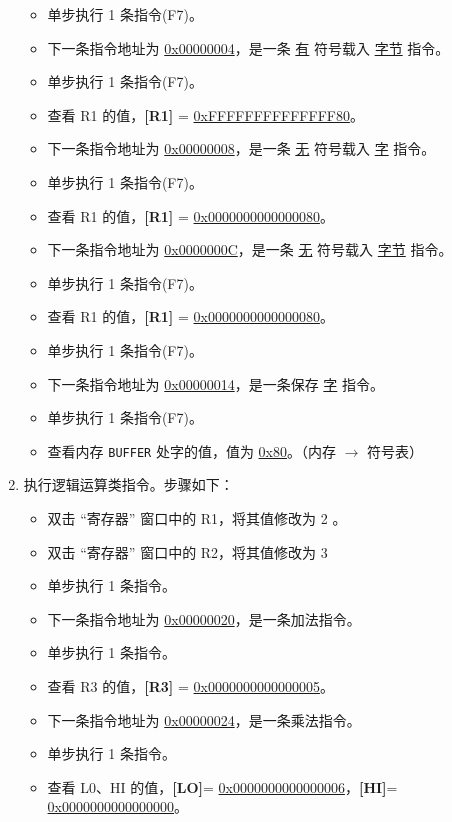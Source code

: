 \documentclass[blue,normal,cn]{elegantnote}
\newcommand{\code}[1]{\colorbox{light-gray}{\texttt{#1}}}
\begin{document}
\begin{enumerate}[wide=0pt, listparindent=2em, parsep=0pt]
          \begin{itemize}[leftmargin=3em]
              \item 单步执行 1 条指令(F7)。
              \item 下一条指令地址为 \uline{0x00000004}，是一条 \uline{有} 符号载入 \uline{字节} 指令。
              \item 单步执行 1 条指令(F7)。
              \item 查看 R1 的值，\textbf{[R1]} = \uline{0xFFFFFFFFFFFFFF80}。
              \item 下一条指令地址为 \uline{0x00000008}，是一条 \uline{无} 符号载入 \uline{字} 指令。
              \item 单步执行 1 条指令(F7)。
              \item 查看 R1 的值，\textbf{[R1]} = \uline{0x0000000000000080}。
              \item 下一条指令地址为 \uline{0x0000000C}，是一条 \uline{无} 符号载入 \uline{字节} 指令。
              \item 单步执行 1 条指令(F7)。
              \item 查看 R1 的值，\textbf{[R1]} = \uline{0x0000000000000080}。
              \item 单步执行 1 条指令(F7)。
              \item 下一条指令地址为 \uline{0x00000014}，是一条保存 \uline{字} 指令。
              \item 单步执行 1 条指令(F7)。
              \item 查看内存 \code{BUFFER} 处字的值，值为 \uline{0x80}。（内存 $\rightarrow$ 符号表）
          \end{itemize}

    \item 执行逻辑运算类指令。步骤如下：
          \begin{itemize}[leftmargin=3em]
              \item 双击 “寄存器” 窗口中的 R1，将其值修改为 2
                    。
              \item 双击 “寄存器” 窗口中的 R2，将其值修改为 3
              \item 单步执行 1 条指令。
              \item 下一条指令地址为 \uline{0x00000020}，是一条加法指令。
              \item 单步执行 1 条指令。
              \item 查看 R3 的值，\textbf{[R3]} = \uline{0x0000000000000005}。
              \item 下一条指令地址为 \uline{0x00000024}，是一条乘法指令。
              \item 单步执行 1 条指令。
              \item 查看 L0、HI 的值，\textbf{[LO]}= \uline{0x0000000000000006}，\textbf{[HI]}= \uline{0x0000000000000000}。
          \end{itemize}


\end{enumerate}
\end{document}
